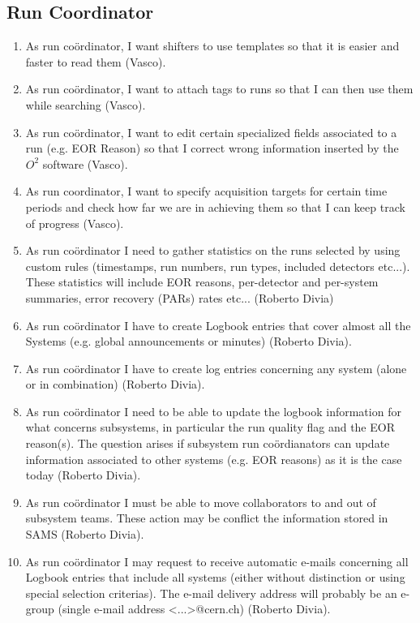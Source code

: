 \subsection{Run Coordinator}
\begin{enumerate}
  \item As run co\"ordinator, I want shifters to use templates so that it is easier and faster to read them (Vasco). 
  \item As run co\"ordinator, I want to attach tags to runs so that I can then use them while searching (Vasco). 
  \item As run co\"ordinator, I want to edit certain specialized fields associated to a run (e.g. EOR Reason) so that I correct wrong information inserted by the $O^2$ software (Vasco). 
  \item As run coordinator, I want to specify acquisition targets for certain time periods and check how far we are in achieving them so that I can keep track of progress (Vasco). 
  \item As run co\"ordinator I need to gather statistics on the runs selected by using custom rules (timestamps, run numbers, run types, included detectors etc...). These statistics will include EOR reasons, per-detector and per-system summaries, error recovery (PARs) rates etc... (Roberto Divia)
  \item As run co\"ordinator I have to create Logbook entries that cover almost all the Systems (e.g. global announcements or minutes) (Roberto Divia).
  \item As run co\"ordinator I have to create log entries concerning any system (alone or in combination) (Roberto Divia).
  \item As run co\"ordinator I need to be able to update the logbook information for what concerns subsystems, in particular the run quality flag and the EOR reason(s). The question arises if subsystem run co\"ordianators can update information associated to other systems (e.g. EOR reasons) as it is the case today (Roberto Divia).
  \item As run co\"ordinator I must be able to move collaborators to and out of subsystem teams. These action may be conflict the information stored in SAMS (Roberto Divia).
  \item As run co\"ordinator I may request to receive automatic e-mails concerning all Logbook entries that include all systems (either without distinction or using special selection criterias). The e-mail delivery address will probably be an e-group (single e-mail address <...>@cern.ch) (Roberto Divia).

\end{enumerate}
